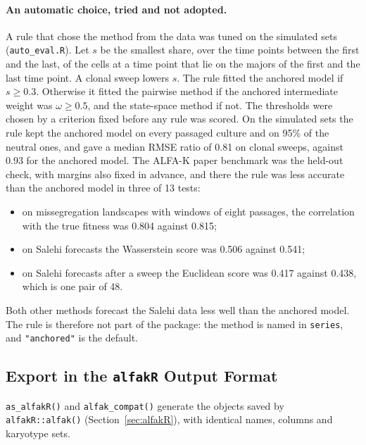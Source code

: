 \documentclass[11pt]{article}
\begin{document}
\paragraph{An automatic choice, tried and not adopted.}
A rule that chose the method from the data was tuned on the simulated sets
(\texttt{auto\_eval.R}). Let $s$ be the smallest share, over the time points
between the first and the last, of the cells at a time point that lie on the
majors of the first and the last time point. A clonal sweep lowers $s$. The
rule fitted the anchored model if $s\ge0.3$. Otherwise it fitted the pairwise
method if the anchored intermediate weight was $\omega\ge0.5$, and the
state-space method if not. The thresholds were chosen by a criterion fixed
before any rule was scored. On the simulated sets the rule kept the anchored
model on every passaged culture and on 95\% of the neutral ones, and gave a
median RMSE ratio of 0.81 on clonal sweeps, against 0.93 for the anchored
model. The ALFA-K paper benchmark was the held-out check, with margins also
fixed in advance, and there the rule was less accurate than the anchored
model in three of 13 tests:
\begin{itemize}
\item on missegregation landscapes with windows of eight passages, the
  correlation with the true fitness was 0.804 against 0.815;
\item on Salehi forecasts the Wasserstein score was 0.506 against 0.541;
\item on Salehi forecasts after a sweep the Euclidean score was 0.417 against
  0.438, which is one pair of 48.
\end{itemize}
Both other methods forecast the Salehi data less well than the anchored model.
The rule is therefore not part of the package: the method is named in
\texttt{series}, and \texttt{"anchored"} is the default.

\subsection{Export in the \texttt{alfakR} Output Format}
\label{sec:sj-alfakR}

\texttt{as\_alfakR()} and \texttt{alfak\_compat()} generate the objects saved
by \texttt{alfakR::alfak()} (Section~\ref{sec:alfakR}), with identical names,
columns and karyotype sets.
\end{document}
